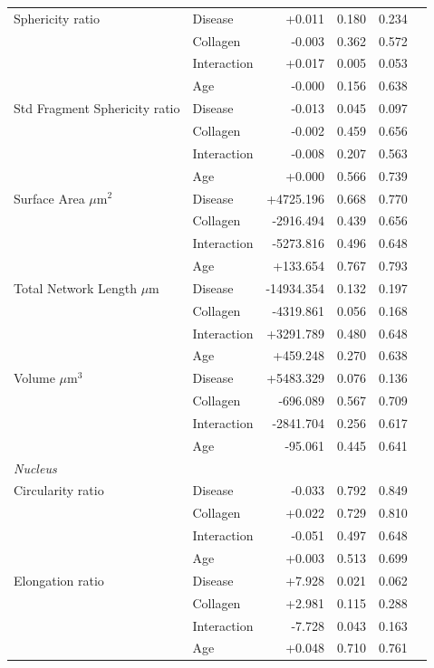 \documentclass[11pt,a4paper]{article}
\begin{document}
\begin{longtable}{llrrrr}
  Sphericity ratio & Disease & +0.011 & 0.180 & 0.234 &  \\
   & Collagen & -0.003 & 0.362 & 0.572 &  \\
   & Interaction & +0.017 & 0.005 & 0.053 &  \\
   & Age & -0.000 & 0.156 & 0.638 &  \\
  Std Fragment Sphericity ratio & Disease & -0.013 & 0.045 & 0.097 &  \\
   & Collagen & -0.002 & 0.459 & 0.656 &  \\
   & Interaction & -0.008 & 0.207 & 0.563 &  \\
   & Age & +0.000 & 0.566 & 0.739 &  \\
  Surface Area $\mu$m$^{2}$ & Disease & +4725.196 & 0.668 & 0.770 &  \\
   & Collagen & -2916.494 & 0.439 & 0.656 &  \\
   & Interaction & -5273.816 & 0.496 & 0.648 &  \\
   & Age & +133.654 & 0.767 & 0.793 &  \\
  Total Network Length $\mu$m & Disease & -14934.354 & 0.132 & 0.197 &  \\
   & Collagen & -4319.861 & 0.056 & 0.168 &  \\
   & Interaction & +3291.789 & 0.480 & 0.648 &  \\
   & Age & +459.248 & 0.270 & 0.638 &  \\
  Volume $\mu$m$^{3}$ & Disease & +5483.329 & 0.076 & 0.136 &  \\
   & Collagen & -696.089 & 0.567 & 0.709 &  \\
   & Interaction & -2841.704 & 0.256 & 0.617 &  \\
   & Age & -95.061 & 0.445 & 0.641 &  \\
\midrule
\multicolumn{6}{l}{\textit{Nucleus}} \\
  Circularity ratio & Disease & -0.033 & 0.792 & 0.849 &  \\
   & Collagen & +0.022 & 0.729 & 0.810 &  \\
   & Interaction & -0.051 & 0.497 & 0.648 &  \\
   & Age & +0.003 & 0.513 & 0.699 &  \\
  Elongation ratio & Disease & +7.928 & 0.021 & 0.062 &  \\
   & Collagen & +2.981 & 0.115 & 0.288 &  \\
   & Interaction & -7.728 & 0.043 & 0.163 &  \\
   & Age & +0.048 & 0.710 & 0.761 &  \\

\end{longtable}
\end{document}
